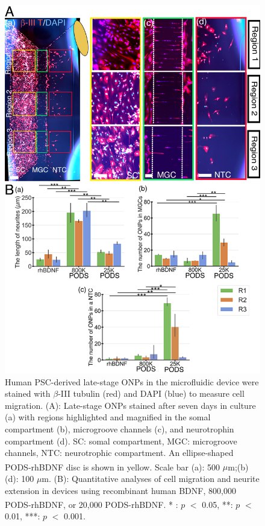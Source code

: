 \documentclass[review]{elsarticle}
\begin{document}
\begin{figure}
	\begin{center}
		\includegraphics[width=12cm]{Fig_11.jpg}
	\end{center}
	\caption{Human PSC-derived late-stage ONPs in the microfluidic device were stained with $\beta$-III tubulin (red) and DAPI (blue) to measure cell migration. (A): Late-stage ONPs stained after seven days in culture (a) with regions highlighted and magnified in the somal compartment (b), microgroove channels (c), and neurotrophin compartment (d). SC: somal compartment, MGC: microgroove channels, NTC: neurotrophic compartment. An ellipse-shaped PODS\textsuperscript{\textregistered}-rhBDNF disc is shown in yellow. Scale bar (a): 500 $\mu$m;(b)\textendash(d): 100 $\mu$m. (B): Quantitative analyses of cell migration and neurite extension in devices using recombinant human BDNF, 800,000 PODS\textsuperscript{\textregistered}-rhBDNF, or 20,000 PODS\textsuperscript{\textregistered}-rhBDNF. * : $p$ $<$ 0.05, **: $p$ $<$ 0.01, ***: $p$ $<$ 0.001.}
\end{figure}
\end{document}
